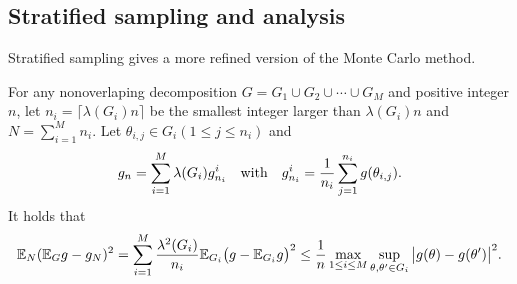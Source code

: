 \subsection{Stratified sampling and analysis}
Stratified sampling  \cite{bickel1984asymptotic} gives a more refined version of the Monte Carlo method. 

\begin{lemma} \label{lem:stratified}
 For any
  nonoverlaping decomposition $G=G_1\cup G_2\cup \cdots \cup G_M$ and
  positive integer $n$, let $n_i=\lceil \lambda(G_i)n\rceil$ be the smallest integer larger than $\lambda(G_i)n$ and $\displaystyle N=\sum_{i=1}^M n_i$.  Let $\theta_{i,j}\in G_i (1\le j\le n_i)$ and 
\begin{equation}
g_n=\sum_{i=1}^M \lambda(G_i)g_{n_i}^i \quad \mbox{with}\quad g_{n_i}^i={1 \over n_i}\sum_{j=1}^{n_i} g(\theta_{i,j}).
\end{equation} 
It holds that  
\begin{equation}
\mathbb{E}_N(\mathbb{E}_G g -g_N)^2=\sum_{i=1}^M {\lambda^2(G_i) \over n_i} \mathbb{E}_{G_i}\big (g -\mathbb{E}_{G_i}g\big )^2
\le {1 \over n} \max_{1\le i\le M}\sup_{\theta, \theta'\in G_i}\big |g(\theta) - g(\theta')\big |^2.
\end{equation}
\end{lemma} 

